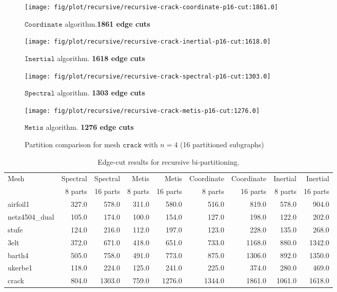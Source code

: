 \documentclass[unicode,11pt,a4paper,oneside,numbers=endperiod,openany]{scrartcl}
\begin{document}
\begin{figure}[h!]
    \begin{minipage}{0.5\textwidth}
        \centering
        \texttt{[image: fig/plot/recursive/recursive-crack-coordinate-p16-cut:1861.0]}
        \caption{$\texttt {Coordinate}$ algorithm.\textbf{1861 edge cuts}}
    \end{minipage}
    \begin{minipage}{0.5\textwidth}
        \centering
        \texttt{[image: fig/plot/recursive/recursive-crack-inertial-p16-cut:1618.0]}
        \caption{$\texttt {Inertial}$ algorithm. \textbf{1618 edge cuts}}
    \end{minipage}
        \begin{minipage}{0.5\textwidth}
        \centering
        \texttt{[image: fig/plot/recursive/recursive-crack-spectral-p16-cut:1303.0]}
        \caption{$\texttt {Spectral}$ algorithm. \textbf{1303 edge cuts}}
    \end{minipage}
    \begin{minipage}{0.5\textwidth}
        \centering
        \texttt{[image: fig/plot/recursive/recursive-crack-metis-p16-cut:1276.0]}
        \caption{$\texttt {Metis}$ algorithm. \textbf{1276 edge cuts}}
    \end{minipage}
    \caption*{Partition comparison for mesh $\texttt {crack}$ with $n=4$ (16 partitioned subgraphs)}
\end{figure}


\begin{table}[h!]
\caption{Edge-cut results for recursive bi-partitioning.}
\begin{tabular}{l|r|r|r|r|r|r|r|r} \hline\hline 
          Mesh & Spectral & Spectral &   Metis &    Metis & Coordinate & Coordinate & Inertial & Inertial \\
               &  8 parts & 16 parts & 8 parts & 16 parts &    8 parts &   16 parts &  8 parts & 16 parts \\
\hline
      airfoil1 &    327.0 &    578.0 &   311.0 &    580.0 &      516.0 &      819.0 &    578.0 &    904.0 \\
 netz4504\_dual &    105.0 &    174.0 &   100.0 &    154.0 &      127.0 &      198.0 &    122.0 &    202.0 \\
         stufe &    124.0 &    216.0 &   112.0 &    197.0 &      123.0 &      228.0 &    135.0 &    268.0 \\
          3elt &    372.0 &    671.0 &   418.0 &    651.0 &      733.0 &     1168.0 &    880.0 &   1342.0 \\
        barth4 &    505.0 &    758.0 &   491.0 &    773.0 &      875.0 &     1306.0 &    892.0 &   1350.0 \\
       ukerbe1 &    118.0 &    224.0 &   125.0 &    241.0 &      225.0 &      374.0 &    280.0 &    469.0 \\
         crack &    804.0 &   1303.0 &   759.0 &   1276.0 &     1344.0 &     1861.0 &   1061.0 &   1618.0 \\


 \hline \hline
\end{tabular}
\label{table:Rec_bisection}
\end{table}
\end{document}
